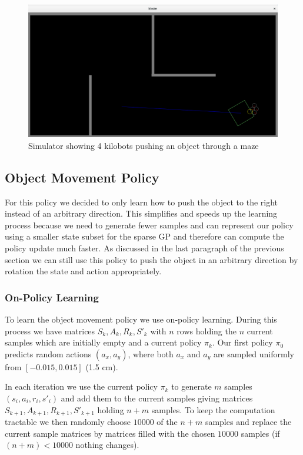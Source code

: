 \documentclass[twoside]{article}
\begin{document}
\begin{figure}[!htb]
    \centering
    \includegraphics[width=0.9\linewidth]{figures/simulator_maze.png}
    \caption{Simulator showing 4 kilobots pushing an object through a maze}
    \label{fig:simulator}
\end{figure}

\subsection{Object Movement Policy}
\label{sec:objpolicy}

For this policy we decided to only learn how to push the object to the right
instead of an arbitrary direction. This simplifies and speeds up the learning
process because we need to generate fewer samples and can represent our policy
using a smaller state subset for the sparse GP and therefore can compute the
policy update much faster. As discussed in the last paragraph of the previous
section we can still use this policy to push the object in an arbitrary
direction by rotation the state and action appropriately.

\subsubsection{On-Policy Learning}

To learn the object movement policy we use on-policy learning. During this
process we have matrices $S_k, A_k, R_k, S'_k$ with $n$ rows holding the $n$
current samples which are initially empty and a current policy $\pi_k$. Our
first policy $\pi_0$ predicts random actions $(a_x, a_y)$, where both $a_x$ and
$a_y$ are sampled uniformly from $[-0.015, 0.015]$ (1.5 cm).

In each iteration we use the current policy $\pi_k$ to generate $m$ samples
$(s_i, a_i, r_i, s'_i)$ and add them to the current samples giving matrices
$S_{k+1}, A_{k+1}, R_{k+1}, S'_{k+1}$ holding $n + m$ samples. To keep the
computation tractable we then randomly choose $10000$ of the $n + m$ samples
and replace the current sample matrices by matrices filled with the chosen
$10000$ samples (if $(n + m) < 10000$ nothing changes).
\end{document}
